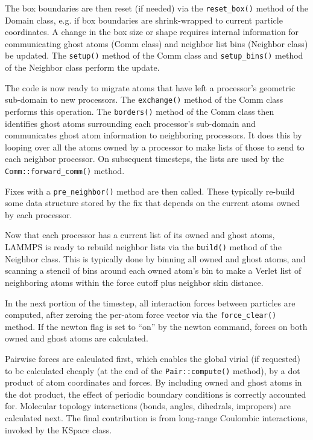 \documentclass{article}
\newcommand{\code}[1]{{\color{cadetblue}\texttt{#1}}}
\begin{document}
The box boundaries are then reset (if needed) via the \code{reset\_box()} method
of the Domain class, e.g. if box boundaries are shrink-wrapped to current
particle coordinates. A change in the box size or shape requires internal
information for communicating ghost atoms (Comm class) and neighbor list bins
(Neighbor class) be updated. The \code{setup()} method of the Comm class and
\code{setup\_bins()} method of the Neighbor class perform the update.

The code is now ready to migrate atoms that have left a processor's
geometric sub-domain to new processors.  The \code{exchange()} method of the
Comm class performs this operation.  The \code{borders()} method of the Comm
class then identifies ghost atoms surrounding each processor's
sub-domain and communicates ghost atom information to neighboring
processors.  It does this by looping over all the atoms owned by a
processor to make lists of those to send to each neighbor processor.
On subsequent timesteps, the lists are used by the
\code{Comm::forward\_comm()} method.

Fixes with a \code{pre\_neighbor()} method are then called. These typically
re-build some data structure stored by the fix that depends on the current atoms
owned by each processor.

Now that each processor has a current list of its owned and ghost
atoms, LAMMPS is ready to rebuild neighbor lists via the \code{build()}
method of the Neighbor class.  This is typically done by binning all
owned and ghost atoms, and scanning a stencil of bins around each
owned atom's bin to make a Verlet list of neighboring atoms within the
force cutoff plus neighbor skin distance.

In the next portion of the timestep, all interaction forces between
particles are computed, after zeroing the per-atom force vector via
the \code{force\_clear()} method.  If the newton flag is set to ``on'' by the
newton command, forces on both owned and ghost atoms are calculated.

Pairwise forces are calculated first, which enables the global virial
(if requested) to be calculated cheaply (at the end of the
\code{Pair::compute()} method), by a dot product of atom coordinates and
forces.  By including owned and ghost atoms in the dot product, the
effect of periodic boundary conditions is correctly accounted for.
Molecular topology interactions (bonds, angles, dihedrals, impropers)
are calculated next.  The final contribution is from long-range
Coulombic interactions, invoked by the KSpace class.
\end{document}
